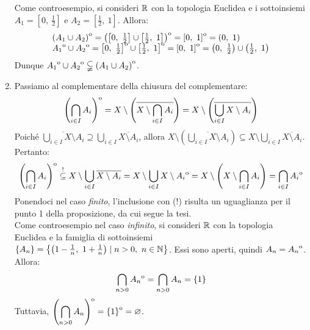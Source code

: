 \begin{demonstration}
\begin{enumerate}[label=\Roman*]
Come controesempio, si consideri $\mathbb{R}$ con la topologia Euclidea e i sottoinsiemi $A_1=\left[0,\ \frac{1}{2}\right]$ e $A_2=\left[\frac{1}{2},\ 1\right]$. Allora:
\begin{equation*}
	\begin{array}{l}
		\interior{\left(A_1\cup A_2\right)}=\interior{\left(\left[0,\ \frac{1}{2}\right]\cup\left[\frac{1}{2},\ 1\right]\right)}=\interior{\left[0,\ 1\right]}=\left(0,\ 1\right)\\
		\interior{A_1}\cup \interior{A_2}=\interior{\left[0,\ \frac{1}{2}\right]}\cup\interior{\left[\frac{1}{2},\ 1\right]}=\interior{\left[0,\ 1\right]}=\left(0,\ \frac{1}{2}\right)\cup\left(\frac{1}{2},\ 1\right)
	\end{array}
\end{equation*}
Dunque ${\kern0ptA_1}^{\mathrm{o}}\cup {\kern0ptA_2}^{\mathrm{o}}\subsetneqq{\kern0pt\left(A_1\cup A_2\right)}^{\mathrm{o}}$.
\item Passiamo al complementare della chiusura del complementare:
\begin{equation*}
{\kern0pt\left(\bigcap_{i\in I}A_i\right)}^{\mathrm{o}}=X\setminus\left(\overline{X\setminus \bigcap_{i\in I}A_i}\right)=X\setminus\left(\overline{\bigcup_{i\in I}X\setminus A_i}\right)
\end{equation*}
Poiché $\displaystyle \overline{\bigcup_{i\in I}X\setminus A_i}\supseteq \bigcup_{i\in I}\overline{X\setminus A_i}$, allora $\displaystyle X\setminus\left(\overline{\bigcup_{i\in I}X\setminus A_i}\right) \subseteq X\setminus\bigcup_{i\in I}\overline{X\setminus A_i}$. Pertanto:
\begin{equation*}
		{\kern0pt\left(\bigcap_{i\in I}A_i\right)}^{\mathrm{o}}\stackrel{!}{\subseteq} X\setminus\bigcup_{i\in I}\overline{X\setminus A_i}=X\setminus\bigcup_{i\in I}X\setminus {\kern0ptA_i}^{\mathrm{o}} =X\setminus\left(X\setminus\bigcap_{i\in I}A_i \right)=\bigcap_{i\in I}{\kern0ptA_i}^{\mathrm{o}}
\end{equation*}
Ponendoci nel caso \textit{finito}, l'inclusione con (!) risulta un uguaglianza per il punto 1 della proposizione, da cui segue la tesi.\\
Come controesempio nel caso \textit{infinito}, si consideri $\mathbb{R}$ con la topologia Euclidea e la famiglia di sottoinsiemi $\left\{A_n\right\}=\left\{\left(1-\frac{1}{n},\ 1+\frac{1}{n}\right)\mid n> 0,\ n\in \naturalset\right\}$. Essi sono aperti, quindi $A_n={\kern0ptA_n}^{\mathrm{o}}$. Allora:
\begin{equation*}
	\bigcap_{n>0}{\kern0ptA_n}^{\mathrm{o}}=\bigcap_{n>0}A_n=\{1\}
\end{equation*}
Tuttavia, $\displaystyle {\kern0pt\left(\bigcap_{n>0}A_n\right)}^{\mathrm{o}}={\kern0pt\{1\}}^{\mathrm{o}}=\varnothing$.
\end{enumerate}
	\vspace{-3mm}
\end{demonstration}
